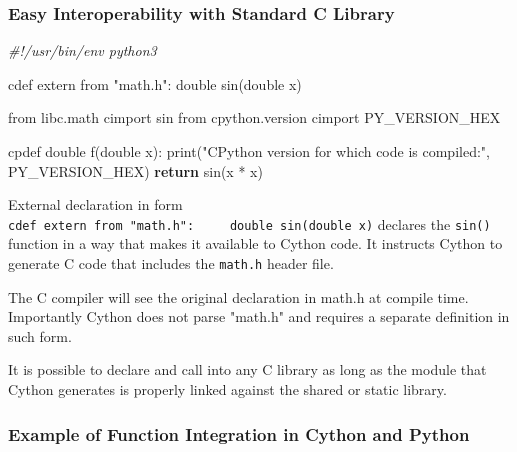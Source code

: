 \documentclass[
]{article}
\newenvironment{Shaded}{}{}
\newcommand{\BuiltInTok}[1]{#1}
\newcommand{\CommentTok}[1]{\textcolor[rgb]{0.38,0.63,0.69}{\textit{#1}}}
\newcommand{\ControlFlowTok}[1]{\textcolor[rgb]{0.00,0.44,0.13}{\textbf{#1}}}
\newcommand{\ImportTok}[1]{#1}
\newcommand{\NormalTok}[1]{#1}
\newcommand{\OperatorTok}[1]{\textcolor[rgb]{0.40,0.40,0.40}{#1}}
\newcommand{\StringTok}[1]{\textcolor[rgb]{0.25,0.44,0.63}{#1}}
\begin{document}
\hypertarget{easy-interoperability-with-standard-c-library}{%
\subsubsection{Easy Interoperability with Standard C
Library}\label{easy-interoperability-with-standard-c-library}}

\begin{Shaded}
\begin{Highlighting}[]
\CommentTok{\#!/usr/bin/env python3}

\NormalTok{cdef extern }\ImportTok{from} \StringTok{"math.h"}\NormalTok{:     }
\NormalTok{    double sin(double x)}

\ImportTok{from}\NormalTok{ libc.math cimport sin}
\ImportTok{from}\NormalTok{ cpython.version cimport PY\_VERSION\_HEX}

\NormalTok{cpdef double f(double x):     }
  \BuiltInTok{print}\NormalTok{(}\StringTok{"CPython version for which code is compiled:"}\NormalTok{, PY\_VERSION\_HEX)}
  \ControlFlowTok{return}\NormalTok{ sin(x }\OperatorTok{*}\NormalTok{ x)}
\end{Highlighting}
\end{Shaded}

External declaration in form
\texttt{cdef\ extern\ from\ "math.h":\ \ \ \ \ double\ sin(double\ x)}
declares the \texttt{sin()} function in a way that makes it available to
Cython code. It instructs Cython to generate C code that includes the
\texttt{math.h} header file.

The C compiler will see the original declaration in math.h at compile
time. Importantly Cython does not parse "math.h" and requires a separate
definition in such form.

It is possible to declare and call into any C library as long as the
module that Cython generates is properly linked against the shared or
static library.

\hypertarget{example-of-function-integration-in-cython-and-python}{%
\subsubsection{Example of Function Integration in Cython and
Python}\label{example-of-function-integration-in-cython-and-python}}
\end{document}
